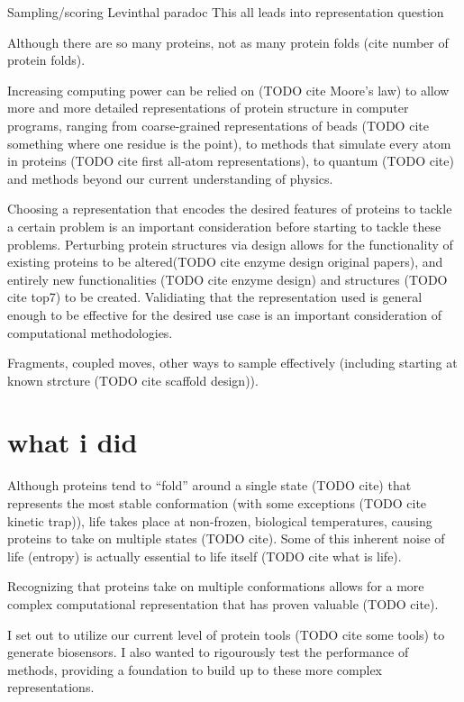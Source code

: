 Sampling/scoring
Levinthal paradoc
This all leads into representation question

Although there are so many proteins, not as many protein folds (cite number of protein folds).

Increasing computing power can be relied on (TODO cite Moore's law) to allow more and more detailed representations of protein structure in computer programs, ranging from coarse-grained representations of beads (TODO cite something where one residue is the point), to methods that simulate every atom in proteins (TODO cite first all-atom representations), to quantum (TODO cite) and methods beyond our current understanding of physics.

Choosing a representation that encodes the desired features of proteins to tackle a certain problem is an important consideration before starting to tackle these problems.
Perturbing protein structures via design allows for the functionality of existing proteins to be altered(TODO cite enzyme design original papers), and entirely new functionalities (TODO cite enzyme design) and structures (TODO cite top7) to be created.
Validiating that the representation used is general enough to be effective for the desired use case is an important consideration of computational methodologies.

Fragments, coupled moves, other ways to sample effectively (including starting at known strcture (TODO cite scaffold design)).

\section{what i did}
Although proteins tend to ``fold'' around a single state (TODO cite) that represents the most stable conformation (with some exceptions (TODO cite kinetic trap)), life takes place at non-frozen, biological temperatures, causing proteins to take on multiple states (TODO cite).
Some of this inherent noise of life (entropy) is actually essential to life itself (TODO cite what is life).

Recognizing that proteins take on multiple conformations allows for a more complex computational representation that has proven valuable (TODO cite).

I set out to utilize our current level of protein tools (TODO cite some tools) to generate biosensors.
I also wanted to rigourously test the performance of methods, providing a foundation to build up to these more complex representations.

